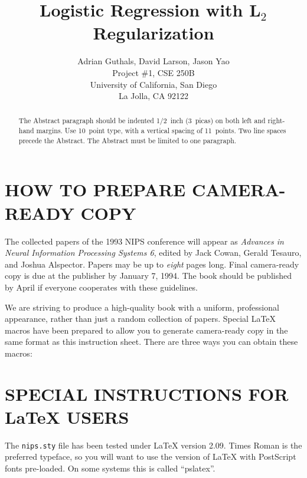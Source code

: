 
\title{Logistic Regression with L$_2$ Regularization}

\author{Adrian Guthals, David Larson, Jason Yao \\
Project \#1, CSE 250B\\
University of California, San Diego\\
La Jolla, CA 92122\\
}




\maketitle


\begin{abstract}
The Abstract paragraph should be indented 1/2~inch (3~picas) on
both left and right-hand margins. Use 10~point type, with a
vertical spacing of 11~points. Two line spaces precede the Abstract.
The Abstract must be limited to one paragraph.
\end{abstract}


\section{HOW TO PREPARE CAMERA-READY COPY}
The collected papers of the 1993 NIPS conference will appear as
{\it Advances in Neural Information Processing Systems 6}, edited
by Jack Cowan, Gerald Tesauro, and Joshua Alspector.  Papers
may be up to {\it eight} pages long.  Final camera-ready copy is
due at the publisher by January 7, 1994.  The book should be
published by April if everyone cooperates with these guidelines.

We are striving to produce a high-quality book with a uniform,
professional appearance, rather than just a random collection of
papers. Special \LaTeX{} macros have been prepared to allow
you to generate camera-ready copy in the same format as this
instruction sheet.  There are three ways you can obtain these
macros:

\section{SPECIAL INSTRUCTIONS FOR \LaTeX{} USERS}
The \verb+nips.sty+ file has been tested under \LaTeX{} version 2.09. 
Times Roman is the preferred typeface, so you will want to use the
version of \LaTeX{} with PostScript fonts pre-loaded.  On some systems
this is called ``pslatex''.

